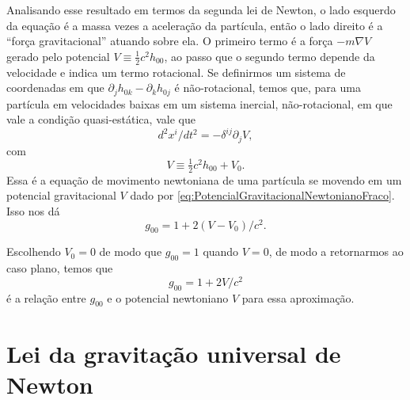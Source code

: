 Analisando esse resultado em termos da segunda lei de Newton, o lado esquerdo da equação é a massa vezes a aceleração da partícula, então o lado direito é a ``força gravitacional'' atuando sobre ela. O primeiro termo é a força $ -m \nabla V $ gerado pelo potencial $ V \equiv \tfrac{1}{2} c^{2} h_{00} $, ao passo que o segundo termo depende da velocidade e indica um termo rotacional. Se definirmos um sistema de coordenadas em que $ \partial_{j} h_{0 k}-\partial_{k} h_{0 j} $ é não-rotacional, temos que, para uma partícula em velocidades baixas em um sistema inercial, não-rotacional, em que vale a condição quasi-estática, vale que
\begin{equation}\label{eq:EquacaoMovimentoPotencial}
d^{2} x^{i} / d t^{2}=-\delta^{i j} \partial_{j} V,
\end{equation}
com
\begin{equation}\label{eq:PotencialGravitacionalNewtonianoFraco}
V \equiv \tfrac{1}{2} c^{2} h_{00}+V_0.
\end{equation}
Essa é a equação de movimento newtoniana de uma partícula se movendo em um potencial gravitacional $ V $ dado por \eqref{eq:PotencialGravitacionalNewtonianoFraco}. Isso nos dá
\[
g_{00}=1+ 2(V-V_0) / c^{2}.
\]

Escolhendo $ V_0=0 $ de modo que $ g_{00} = 1 $ quando $ V=0 $, de modo a retornarmos ao caso plano, temos que
\begin{equation}\label{eq:RelacaoG00Potencial}
\boxed{
g_{00}=1+2 V / c^{2}}
\end{equation}
é a relação entre $ g_{00} $ e o potencial newtoniano $ V $ para essa aproximação.

\section{Lei da gravitação universal de Newton}\label{sec:GravitacaoNewton}

